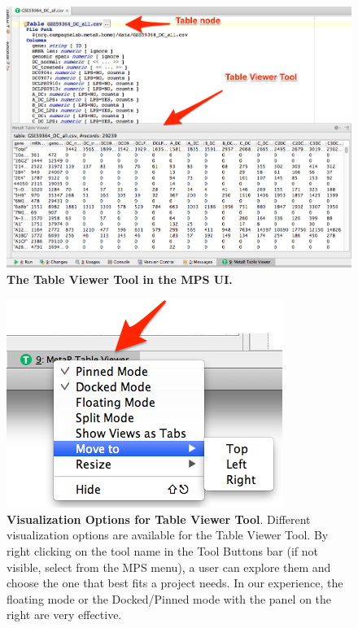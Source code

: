\begin{figure}[h!tbp]
  \centering
  \includegraphics[width=\figWidthWide]{figures/TableViewerInMPS.png}
\caption[The Table Viewer Tool in the MPS UI]{\textbf{The Table Viewer Tool in the MPS UI.} }
\label{fig:TableViewerInMPS}
\end{figure}

\begin{figure}
  \centering
  \includegraphics[width=\figWidthTiny]{figures/ToolVisualizationOptions.png}
\caption[Visualization Options for Table Viewer Tool]{\textbf{Visualization Options for Table Viewer Tool}. Different visualization options are available for the Table Viewer Tool. By right clicking on the tool name in the Tool Buttons bar (if not visible, select   from the MPS menu), a user can explore them and choose the one that best fits a project needs. In our experience, the floating mode or the Docked/Pinned mode with the panel on the right are very effective.}
\label{fig:ToolVisualizationOptions}
\end{figure}

